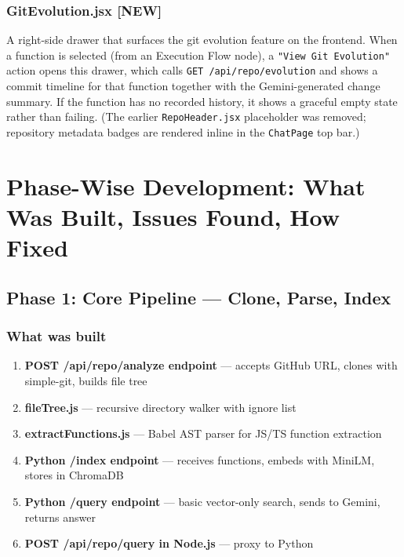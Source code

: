 \documentclass[a4paper,11pt]{article}
\begin{document}
\subsubsection{GitEvolution.jsx \textbf{[NEW]}}
A right-side drawer that surfaces the git evolution feature on the frontend. When a function is selected (from an Execution Flow node), a \texttt{"View Git Evolution"} action opens this drawer, which calls \texttt{GET /api/repo/evolution} and shows a commit timeline for that function together with the Gemini-generated change summary. If the function has no recorded history, it shows a graceful empty state rather than failing. (The earlier \texttt{RepoHeader.jsx} placeholder was removed; repository metadata badges are rendered inline in the \texttt{ChatPage} top bar.)

\newpage

\section{Phase-Wise Development: What Was Built, Issues Found, How Fixed}

\subsection{Phase 1: Core Pipeline --- Clone, Parse, Index}

\subsubsection{What was built}
\begin{enumerate}
    \item \textbf{POST /api/repo/analyze endpoint} --- accepts GitHub URL, clones with simple-git, builds file tree
    \item \textbf{fileTree.js} --- recursive directory walker with ignore list
    \item \textbf{extractFunctions.js} --- Babel AST parser for JS/TS function extraction
    \item \textbf{Python /index endpoint} --- receives functions, embeds with MiniLM, stores in ChromaDB
    \item \textbf{Python /query endpoint} --- basic vector-only search, sends to Gemini, returns answer
    \item \textbf{POST /api/repo/query in Node.js} --- proxy to Python
\end{enumerate}
\end{document}
